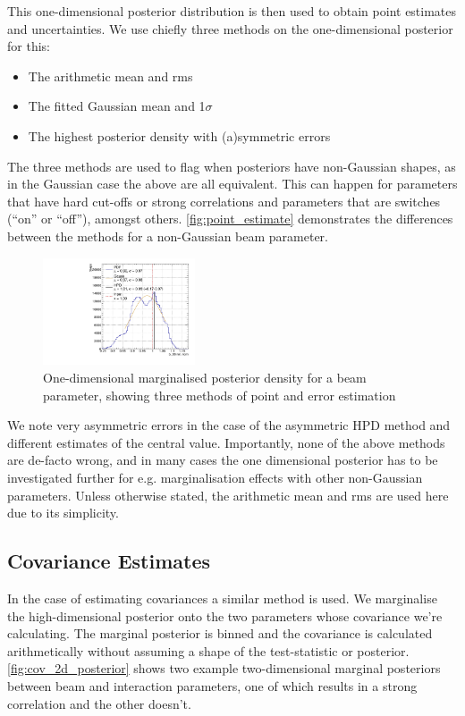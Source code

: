 This one-dimensional posterior distribution is then used to obtain point estimates and uncertainties. We use chiefly three methods on the one-dimensional posterior for this:
\begin{itemize}
	\item The arithmetic mean and rms
	\item The fitted Gaussian mean and 1$\sigma$
	\item The highest posterior density with (a)symmetric errors
\end{itemize}
The three methods are used to flag when posteriors have non-Gaussian shapes, as in the Gaussian case the above are all equivalent. This can happen for parameters that have hard cut-offs or strong correlations and parameters that are switches (``on'' or ``off''), amongst others. \autoref{fig:point_estimate} demonstrates the differences between the methods for a non-Gaussian beam parameter.
\begin{figure}[h]
	\includegraphics[width=0.4\textwidth, trim={0mm 0mm 0mm 0mm}, clip,page=1]{figures/mcmc/b88_example}
	\caption{One-dimensional marginalised posterior density for a beam parameter, showing three methods of point and error estimation}
	\label{fig:point_estimate}
\end{figure}
We note very asymmetric errors in the case of the asymmetric HPD method and different estimates of the central value. Importantly, none of the above methods are de-facto wrong, and in many cases the one dimensional posterior has to be investigated further for e.g. marginalisation effects with other non-Gaussian parameters. Unless otherwise stated, the arithmetic mean and rms are used here due to its simplicity.

\subsection{Covariance Estimates}
In the case of estimating covariances a similar method is used. We marginalise the high-dimensional posterior onto the two parameters whose covariance we're calculating. The marginal posterior is binned and the covariance is calculated arithmetically without assuming a shape of the test-statistic or posterior. \autoref{fig:cov_2d_posterior} shows two example two-dimensional marginal posteriors between beam and interaction parameters, one of which results in a strong correlation and the other doesn't.

